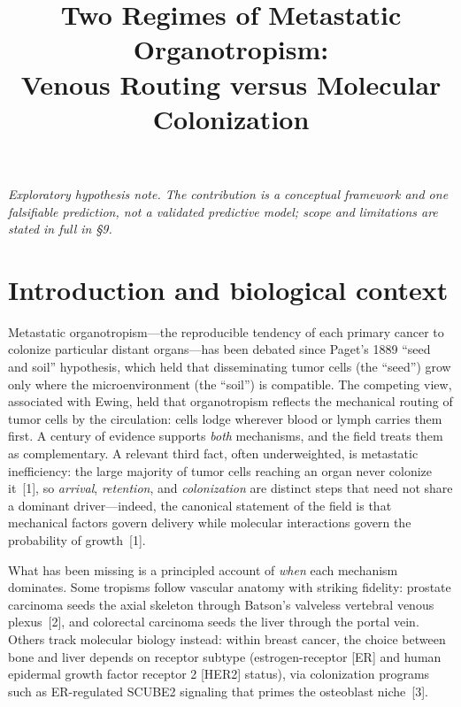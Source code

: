 \documentclass[11pt]{article}
\title{\textbf{Two Regimes of Metastatic Organotropism:\\ Venous Routing versus Molecular Colonization}}
\author{}
\date{}
\begin{document}
\maketitle
\vspace{-3em}

\begin{center}
\emph{Exploratory hypothesis note. The contribution is a conceptual framework and
one falsifiable prediction, not a validated predictive model; scope and
limitations are stated in full in \S9.}
\end{center}
\vspace{1em}

\section{Introduction and biological context}

Metastatic organotropism---the reproducible tendency of each primary cancer to
colonize particular distant organs---has been debated since Paget's 1889
``seed and soil'' hypothesis, which held that disseminating tumor cells (the
``seed'') grow only where the microenvironment (the ``soil'') is compatible. The
competing view, associated with Ewing, held that organotropism reflects the
mechanical routing of tumor cells by the circulation: cells lodge wherever blood
or lymph carries them first. A century of evidence supports \emph{both}
mechanisms, and the field treats them as complementary. A relevant third fact,
often underweighted, is metastatic inefficiency: the large majority of tumor
cells reaching an organ never colonize it~[1], so \emph{arrival},
\emph{retention}, and \emph{colonization} are distinct steps that need not share a
dominant driver---indeed, the canonical statement of the field is that mechanical
factors govern delivery while molecular interactions govern the probability of
growth~[1].

What has been missing is a principled account of \emph{when} each mechanism
dominates. Some tropisms follow vascular anatomy with striking fidelity: prostate
carcinoma seeds the axial skeleton through Batson's valveless vertebral venous
plexus~[2], and colorectal carcinoma seeds the liver through the portal vein. Others
track molecular biology instead: within breast cancer, the choice between bone
and liver depends on receptor subtype (estrogen-receptor [ER] and human epidermal
growth factor receptor 2 [HER2] status), via colonization programs such as
ER-regulated SCUBE2 signaling that primes the osteoblast niche~[3].
\end{document}
